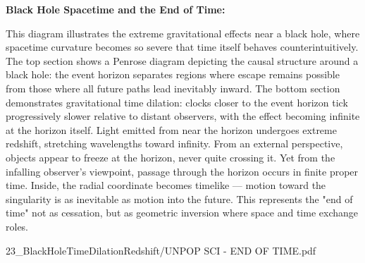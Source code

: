 \begin{SideNotePage}{
  \textbf{Black Hole Spacetime and the End of Time:} \par
  This diagram illustrates the extreme gravitational effects near a black hole, where spacetime curvature becomes so severe that time itself behaves counterintuitively. The top section shows a Penrose diagram depicting the causal structure around a black hole: the event horizon separates regions where escape remains possible from those where all future paths lead inevitably inward. The bottom section demonstrates gravitational time dilation: clocks closer to the event horizon tick progressively slower relative to distant observers, with the effect becoming infinite at the horizon itself. Light emitted from near the horizon undergoes extreme redshift, stretching wavelengths toward infinity. From an external perspective, objects appear to freeze at the horizon, never quite crossing it. Yet from the infalling observer's viewpoint, passage through the horizon occurs in finite proper time. Inside, the radial coordinate becomes timelike — motion toward the singularity is as inevitable as motion into the future. This represents the "end of time" not as cessation, but as geometric inversion where space and time exchange roles.
}{23_BlackHoleTimeDilationRedshift/UNPOP SCI - END OF TIME.pdf}
\end{SideNotePage}

